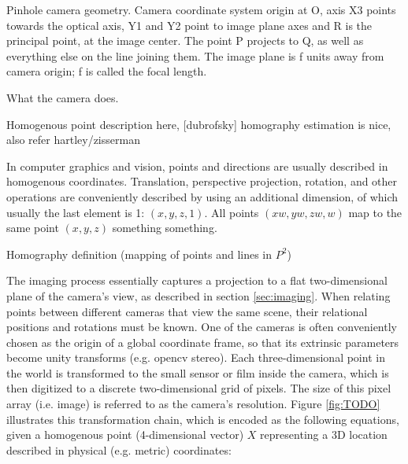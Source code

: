 {Pinhole camera geometry. Camera coordinate system origin at O, axis X3 points towards the optical axis, Y1 and Y2 point to image plane axes and R is the principal point, at the image center. The point P projects to Q, as well as everything else on the line joining them. The image plane is f units away from camera origin; f is called the focal length.}

What the camera does.

Homogenous point description here, [dubrofsky] homography estimation is nice, also refer hartley/zisserman

In computer graphics and vision, points and directions are usually described in homogenous coordinates. Translation, perspective projection, rotation, and other operations are conveniently described by using an additional dimension, of which usually the last element is 1: $(x, y, z, 1)$. All points $(xw, yw, zw, w)$ map to the same point $(x, y, z)$ something something.

Homography definition (mapping of points and lines in $P^2$)

The imaging process essentially captures a projection to a flat two-dimensional plane of the camera's view, as described in section \ref{sec:imaging}.
When relating points between different cameras that view the same scene, their relational positions and rotations must be known.
One of the cameras is often conveniently chosen as the origin of a global coordinate frame, so that its extrinsic parameters become unity transforms (e.g. opencv stereo).
Each three-dimensional point in the world is transformed to the small sensor or film inside the camera, which is then digitized to a discrete two-dimensional grid of pixels. The size of this pixel array (i.e. image) is referred to as the camera's resolution.
Figure \ref{fig:TODO} illustrates this transformation chain, which is encoded as the following equations, given a homogenous point (4-dimensional vector) $X$ representing a 3D location described in physical (e.g. metric) coordinates:

